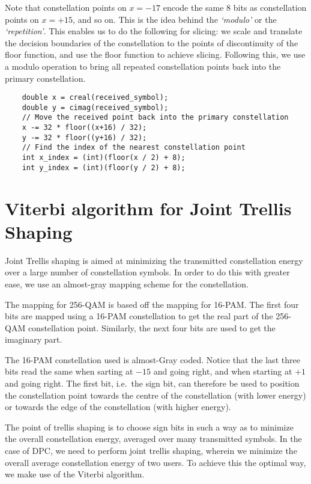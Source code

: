 Note that constellation points on $x=-17$ encode the same 8 bits as
constellation points on $x=+15$, and so on. This is the idea behind the
\emph{`modulo'} or the \emph{`repetition'}. This enables us to do the following
for slicing: we scale and translate the decision boundaries of the
constellation to the points of discontinuity of the floor function, and use the
floor function to achieve slicing. Following this, we use a modulo operation to
bring all repeated constellation points back into the primary constellation.

\begin{lstlisting}
	double x = creal(received_symbol);
	double y = cimag(received_symbol);
	// Move the received point back into the primary constellation
	x -= 32 * floor((x+16) / 32);
	y -= 32 * floor((y+16) / 32);
	// Find the index of the nearest constellation point
	int x_index = (int)(floor(x / 2) + 8);
	int y_index = (int)(floor(y / 2) + 8);
\end{lstlisting}


\section{Viterbi algorithm for Joint Trellis Shaping}

Joint Trellis shaping is aimed at minimizing the transmitted constellation
energy over a large number of constellation symbols. In order to do this with
greater ease, we use an almost-gray mapping scheme for the constellation.

The mapping for 256-QAM is based off the mapping for 16-PAM. The first four
bits are mapped using a 16-PAM constellation to get the real part of the
256-QAM constellation point. Similarly, the next four bits are used to get the
imaginary part.


The 16-PAM constellation used is almost-Gray coded. Notice that the last three
bits read the same when sarting at $-15$ and going right, and when starting at
$+1$ and going right. The first bit, i.e.\ the sign bit, can therefore be used
to position the constellation point towards the centre of the constellation
(with lower energy) or towards the edge of the constellation (with higher
energy).

The point of trellis shaping is to choose sign bits in such a way as to
minimize the overall constellation energy, averaged over many transmitted
symbols. In the case of DPC, we need to perform joint trellis shaping, wherein
we minimize the overall average constellation energy of two users. To achieve
this the optimal way, we make use of the Viterbi algorithm.

